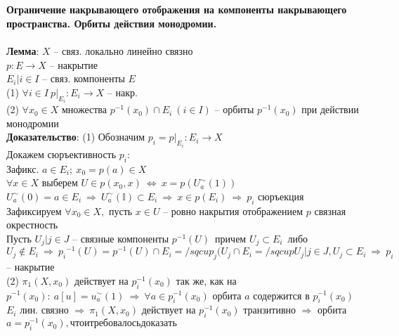 \newpage
\section{}
	\textbf{Ограничение накрывающего отображения на компоненты накрывающего пространства. Орбиты действия монодромии.}\\
	\\
	\textbf{Лемма}: $X$ -- связ. локально линейно связно\\
	$p: E \rightarrow X$ -- накрытие\\
	${E_i|i \in I}$ -- связ. компоненты $E$\\
	(1) $\forall i \in I\ p|_{E_i}: E_i \rightarrow X$ -- накр.\\
	(2) $\forall x_0 \in X$ множества $p^{-1}(x_0)\cap E_i\ (i \in I)$ -- орбиты $p^{-1}(x_0)$ при действии монодромии\\
	\textbf{Доказательство}: (1) Обозначим $p_i = p|_{E_i}: E_i \rightarrow X$\\
	Докажем сюръективность $p_i: $\\
	Зафикс. $a \in E_i;\ x_0 = p(a) \in X$\\
	$\forall x \in X$ выберем $U \in p(x_0,x)\ \Leftrightarrow\ x = p(U^{\sim}_a(1))$\\
	$U^{\sim}_a(0) = a \in E_i\ \Rightarrow\ U^{\sim}_a(\mathbb{I}) \subset E_i\ \Rightarrow\ x \in p(E_i)\ \Rightarrow\ p_i$ сюръекция\\
	Зафиксируем $\forall x_0 \in X,$ пусть $x \in U$ -- ровно накрытия отображением $p$ связная окрестность\\
	Пусть ${U_j|j \in J}$ -- связные компоненты $p^{-1}(U)$\, причем $U_j \subset E_i$\, либо $U_j \notin E_i\ \Rightarrow\ {p_i}^{-1}(U) = p^{-1}(U)\cap E_i = \slash sqcup_j(U_j \cap E_i = \slash sqcup{U_j|j \in J, U_j \subset E_i}\ \Rightarrow\ p_i$ -- накрытие\\
	(2) ${\pi}_1 (X, x_0)$ действует на $p_i^{-1}(x_0)$ так же, как на $p^{-1}(x_0): \ a[u] = u^{\sim}_a(1)\ \Rightarrow\ \forall a \in p_i^{-1}(x_0)$ орбита $a$ содержится в $p_i^{-1}(x_0)$\\
	$E_i$ лин. связно $\Rightarrow\ {\pi}_1 (X, x_0)$ действует на $p_i^{-1}(x_0)$ транзитивно $\Rightarrow$ орбита $a = p_i^{-1}(x_0), что и требовалось доказать$
	


\newpage
